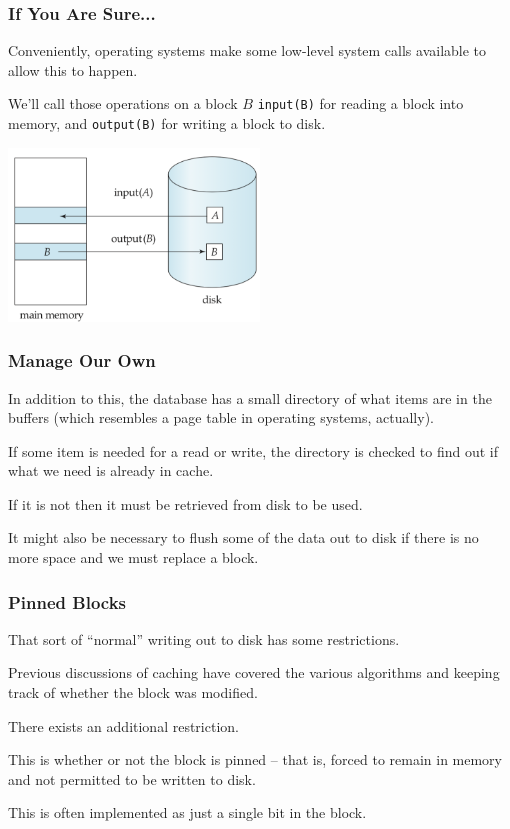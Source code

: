 \begin{frame}
\frametitle{If You Are Sure...}


Conveniently, operating systems make some low-level system calls available to allow this to happen.

 We'll call those operations on a block $B$ \texttt{input(B)} for reading a block into memory, and \texttt{output(B)} for writing a block to disk. 

\begin{center}
	\includegraphics[width=0.5\textwidth]{images/block-storage}
\end{center}


\end{frame}


\begin{frame}
\frametitle{Manage Our Own}

In addition to this, the database has a small directory of what items are in the buffers (which resembles a page table in operating systems, actually). 

If some item is needed for a read or write, the directory is checked to find out if what we need is already in cache. 

If it is not then it must be retrieved from disk to be used. 

It might also be necessary to flush some of the data out to disk if there is no more space and we must replace a block.

\end{frame}

\begin{frame}
\frametitle{Pinned Blocks}

That sort of ``normal'' writing out to disk has some restrictions. 

Previous discussions of caching have covered the various algorithms and keeping track of whether the block was modified. 

There exists an additional restriction. 

This is whether or not the block is \alert{pinned} -- that is, forced to remain in memory and not permitted to be written to disk. 

This is often implemented as just a single bit in the block.
\end{frame}

